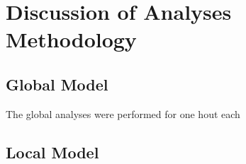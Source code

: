 \section{Discussion of Analyses Methodology}
\subsection{Global Model}
The global analyses were performed for one hout each

 
\subsection{Local Model}
 
 